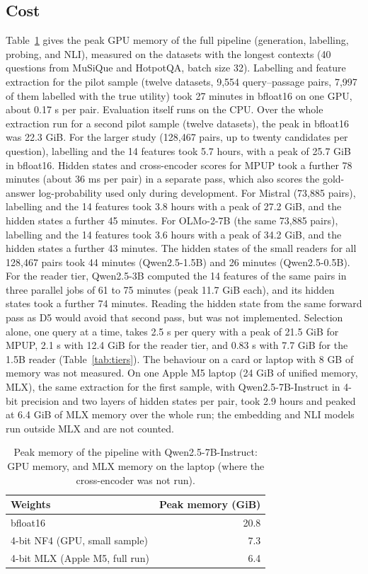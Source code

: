 \documentclass[conference]{IEEEtran}
\begin{document}
\subsection{Cost}
Table~\ref{tab:memory} gives the peak GPU memory of the full pipeline (generation, labelling, probing, and NLI), measured on the datasets with the longest contexts (40 questions from MuSiQue and HotpotQA, batch size 32). Labelling and feature extraction for the pilot sample (twelve datasets, 9,554 query--passage pairs, 7,997 of them labelled with the true utility) took 27 minutes in bfloat16 on one GPU, about 0.17 s per pair. Evaluation itself runs on the CPU. Over the whole extraction run for a second pilot sample (twelve datasets), the peak in bfloat16 was 22.3 GiB. For the larger study (128,467 pairs, up to twenty candidates per question), labelling and the 14 features took 5.7 hours, with a peak of 25.7 GiB in bfloat16. Hidden states and cross-encoder scores for MPUP took a further 78 minutes (about 36 ms per pair) in a separate pass, which also scores the gold-answer log-probability used only during development. For Mistral (73,885 pairs), labelling and the 14 features took 3.8 hours with a peak of 27.2 GiB, and the hidden states a further 45 minutes. For OLMo-2-7B (the same 73,885 pairs), labelling and the 14 features took 3.6 hours with a peak of 34.2 GiB, and the hidden states a further 43 minutes. The hidden states of the small readers for all 128,467 pairs took 44 minutes (Qwen2.5-1.5B) and 26 minutes (Qwen2.5-0.5B). For the reader tier, Qwen2.5-3B computed the 14 features of the same pairs in three parallel jobs of 61 to 75 minutes (peak 11.7 GiB each), and its hidden states took a further 74 minutes. Reading the hidden state from the same forward pass as D5 would avoid that second pass, but was not implemented. Selection alone, one query at a time, takes 2.5 s per query with a peak of 21.5 GiB for MPUP, 2.1 s with 12.4 GiB for the reader tier, and 0.83 s with 7.7 GiB for the 1.5B reader (Table~\ref{tab:tiers}). The behaviour on a card or laptop with 8 GB of memory was not measured. On one Apple M5 laptop (24 GiB of unified memory, MLX), the same extraction for the first sample, with Qwen2.5-7B-Instruct in 4-bit precision and two layers of hidden states per pair, took 2.9 hours and peaked at 6.4 GiB of MLX memory over the whole run; the embedding and NLI models run outside MLX and are not counted.

\begin{table}[htbp]
    \centering
    \caption{Peak memory of the pipeline with Qwen2.5-7B-Instruct: GPU memory, and MLX memory on the laptop (where the cross-encoder was not run).}
    \label{tab:memory}
    \footnotesize
    \begin{tabular}{lr}
        \toprule
        \textbf{Weights} & \textbf{Peak memory (GiB)} \\
        \midrule
        bfloat16 & 20.8 \\
        4-bit NF4 (GPU, small sample) & 7.3 \\
        4-bit MLX (Apple M5, full run) & 6.4 \\
        \bottomrule
    \end{tabular}
\end{table}
\end{document}
